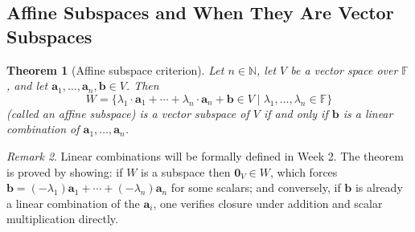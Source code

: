 \documentclass[11pt, a4paper, notitlepage]{report}
\newtheorem{theorem}{Theorem}[section]
\theoremstyle{definition}
\theoremstyle{remark}
\newtheorem{remark}[theorem]{Remark}
\begin{document}
\subsection{Affine Subspaces and When They Are Vector Subspaces}

\begin{theorem}[Affine subspace criterion]\label{thm:affine-subspace}
Let $n \in \mathbb{N}$, let $V$ be a vector space over $\mathbb{F}$, and let $\mathbf{a}_1, \ldots, \mathbf{a}_n, \mathbf{b} \in V$. Then
\[
  W = \{\lambda_1 \cdot \mathbf{a}_1 + \cdots + \lambda_n \cdot \mathbf{a}_n + \mathbf{b} \in V \mid \lambda_1, \ldots, \lambda_n \in \mathbb{F}\}
\]
(called an \emph{affine subspace}) is a vector subspace of $V$ if and only if $\mathbf{b}$ is a linear combination of $\mathbf{a}_1, \ldots, \mathbf{a}_n$.
\end{theorem}

\begin{remark}
Linear combinations will be formally defined in Week 2. The theorem is proved by showing: if $W$ is a subspace then $\mathbf{0}_V \in W$, which forces $\mathbf{b} = (-\lambda_1)\mathbf{a}_1 + \cdots + (-\lambda_n)\mathbf{a}_n$ for some scalars; and conversely, if $\mathbf{b}$ is already a linear combination of the $\mathbf{a}_i$, one verifies closure under addition and scalar multiplication directly.
\end{remark}
\end{document}
